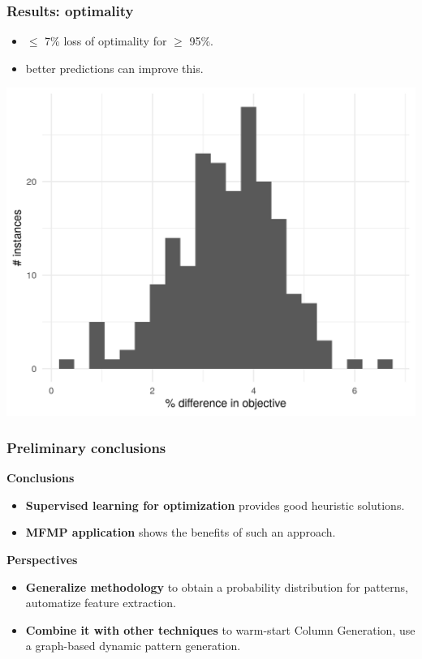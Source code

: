 \begin{frame}
\frametitle{\textbf{Results: optimality}}
  
  \begin{itemize}[<+->]
    \item $\le$ 7\% loss of optimality for $\ge$ 95\%.
    \item better predictions can improve this.
  \end{itemize}

  \includegraphics[width=0.8\linewidth]{images/quality_degradation_2tasks}

\end{frame}

\begin{frame}
\frametitle{\textbf{Preliminary conclusions}}
  \pause
  \begin{block}{\textbf{Conclusions}}
    \begin{itemize}[<+->]
    \item \textbf{Supervised learning for optimization}
      provides good heuristic solutions.
    \item \textbf{MFMP application}
      shows the benefits of such an approach.
    \end{itemize}
  \end{block}  
  \pause
  \begin{block}{\textbf{Perspectives}}
    \begin{itemize}[<+->]
      \item \textbf{Generalize methodology} 
        to obtain a probability distribution for patterns, automatize feature extraction.
      \item \textbf{Combine it with other techniques} 
        to warm-start Column Generation, use a graph-based dynamic pattern generation.
    \end{itemize}
  \end{block}  
\end{frame}